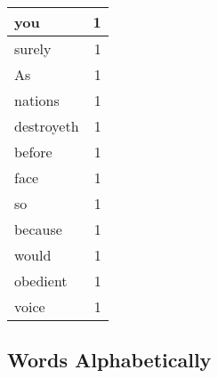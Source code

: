\begin{center}
\begin{longtable}{l|r}
you & 1 \\ \hline
surely & 1 \\ \hline
As & 1 \\ \hline
nations & 1 \\ \hline
destroyeth & 1 \\ \hline
before & 1 \\ \hline
face & 1 \\ \hline
so & 1 \\ \hline
because & 1 \\ \hline
would & 1 \\ \hline
obedient & 1 \\ \hline
voice & 1 \\ \hline
\end{longtable}
\end{center}



\normalsize



\subsection{Words Alphabetically}

